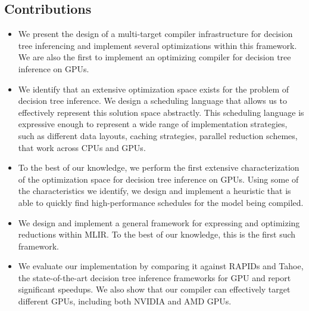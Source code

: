 \subsection{Contributions}
\begin{itemize}
  \item We present the design of a multi-target compiler infrastructure for decision tree 
   inferencing  and implement several optimizations within this framework.
   We are also the first to implement an optimizing compiler for decision tree 
   inference on GPUs. 
  \item We identify that an extensive optimization space exists for the problem of 
  decision tree inference. We design a scheduling language that 
  allows us to effectively represent this solution space abstractly. This 
  scheduling language is expressive enough to represent a wide range of  
  implementation strategies,  %
  such as different data layouts, caching strategies, parallel reduction schemes, 
  that work across CPUs and GPUs. 
  \item To the best of our knowledge, we perform the first extensive characterization
  of the optimization space for decision tree inference 
  on GPUs. Using some of the characteristics we identify, we design and implement 
  a heuristic that is able to quickly find high-performance 
  schedules for the model being compiled. 
  \item We design and implement a general framework for expressing and optimizing
  reductions within MLIR. To the best of our knowledge, this is the first
  such framework.
  \item We evaluate our implementation by comparing it against RAPIDs and Tahoe, 
  the state-of-the-art decision tree inference frameworks for GPU and 
  report significant speedups. We also show that our compiler can effectively 
  target different GPUs, including both NVIDIA and AMD GPUs.
\end{itemize}
